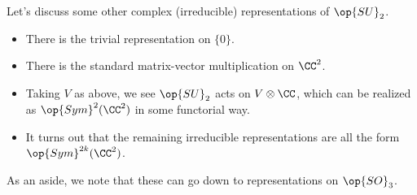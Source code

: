 \documentclass[../notes.tex]{subfiles}
\begin{document}
\begin{remark}
	Let's discuss some other complex (irreducible) representations of $\op{SU}_2$.
	\begin{itemize}
		\item There is the trivial representation on $\{0\}$.
		\item There is the standard matrix-vector multiplication on $\CC^2$.
		\item Taking $V$ as above, we see $\op{SU}_2$ acts on $V\otimes\CC$, which can be realized as $\op{Sym}^2(\CC^2)$ in some functorial way.
		\item It turns out that the remaining irreducible representations are all the form $\op{Sym}^{2k}(\CC^2)$.
	\end{itemize}
	As an aside, we note that these can go down to representations on $\op{SO}_3$.
\end{remark}
\end{document}
